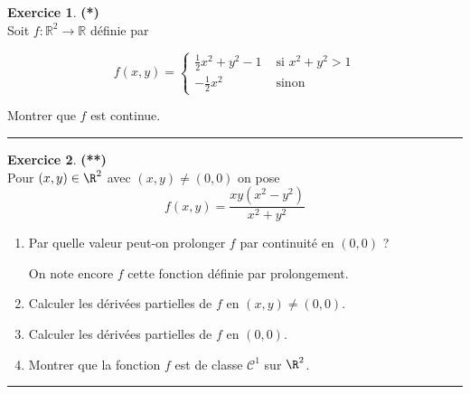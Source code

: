 \documentclass[a4paper,11pt]{article}
\theoremstyle{definition}
\newtheorem{exo}{Exercice} %
\begin{document}
\begin{minipage}{1\linewidth}
\begin{minipage}[t]{0.48\linewidth}
\end{minipage}\hfill\vrule\hfill\begin{minipage}[t]{0.48\linewidth}\raggedright

\begin{exo}\textbf{(*)}\quad\\[0.2cm]
	Soit $f: \mathbb{R}^{2} \rightarrow \mathbb{R}$ définie par
	
	$$
	f(x, y)= \begin{cases}\frac{1}{2} x^{2}+y^{2}-1 & \text { si } x^{2}+y^{2}>1 \\ -\frac{1}{2} x^{2} & \text { sinon }\end{cases}
	$$
	
	Montrer que $f$ est continue.
	
	\centering\rule{1\linewidth}{0.6pt}\end{exo}

\begin{exo}\textbf{(**)}\quad\\[0.2cm]%
Pour $(x,y)\in\R^2$ avec $(x,y)\neq (0,0)$ on pose 
$$f(x,y) = \dfrac{xy(x^2-y^2)}{x^2+y^2}$$
\begin{enumerate}
	\item Par quelle valeur peut-on prolonger $f$ par continuité en $(0,0)$ ?

On note encore $f$ cette fonction définie par prolongement.
	\item Calculer les dérivées partielles de $f$ en $(x,y)\neq(0,0)$.
	\item Calculer les dérivées partielles de $f$ en $(0,0)$.
	\item Montrer que la fonction $f$ est de classe $\mathcal{C}^1$ sur $\R^2$.
\end{enumerate}

\centering\rule{1\linewidth}{0.6pt}\end{exo}



\end{minipage}\end{minipage} \newpage
\end{document}
